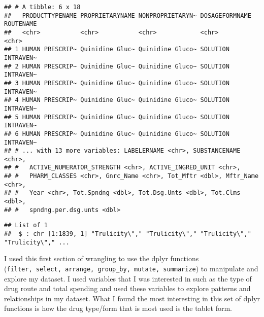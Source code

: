 \documentclass[
]{article}
\newenvironment{Shaded}{\begin{snugshade}}{\end{snugshade}}
\newcommand{\CommentTok}[1]{\textcolor[rgb]{0.56,0.35,0.01}{\textit{#1}}}
\newcommand{\KeywordTok}[1]{\textcolor[rgb]{0.13,0.29,0.53}{\textbf{#1}}}
\newcommand{\NormalTok}[1]{#1}
\newcommand{\OperatorTok}[1]{\textcolor[rgb]{0.81,0.36,0.00}{\textbf{#1}}}
\newcommand{\StringTok}[1]{\textcolor[rgb]{0.31,0.60,0.02}{#1}}
\begin{document}
\begin{verbatim}
## # A tibble: 6 x 18
##   PRODUCTTYPENAME PROPRIETARYNAME NONPROPRIETARYN~ DOSAGEFORMNAME ROUTENAME
##   <chr>           <chr>           <chr>            <chr>          <chr>    
## 1 HUMAN PRESCRIP~ Quinidine Gluc~ Quinidine Gluco~ SOLUTION       INTRAVEN~
## 2 HUMAN PRESCRIP~ Quinidine Gluc~ Quinidine Gluco~ SOLUTION       INTRAVEN~
## 3 HUMAN PRESCRIP~ Quinidine Gluc~ Quinidine Gluco~ SOLUTION       INTRAVEN~
## 4 HUMAN PRESCRIP~ Quinidine Gluc~ Quinidine Gluco~ SOLUTION       INTRAVEN~
## 5 HUMAN PRESCRIP~ Quinidine Gluc~ Quinidine Gluco~ SOLUTION       INTRAVEN~
## 6 HUMAN PRESCRIP~ Quinidine Gluc~ Quinidine Gluco~ SOLUTION       INTRAVEN~
## # ... with 13 more variables: LABELERNAME <chr>, SUBSTANCENAME <chr>,
## #   ACTIVE_NUMERATOR_STRENGTH <chr>, ACTIVE_INGRED_UNIT <chr>,
## #   PHARM_CLASSES <chr>, Gnrc_Name <chr>, Tot_Mftr <dbl>, Mftr_Name <chr>,
## #   Year <chr>, Tot.Spndng <dbl>, Tot.Dsg.Unts <dbl>, Tot.Clms <dbl>,
## #   spndng.per.dsg.unts <dbl>
\end{verbatim}

\begin{Shaded}
\end{Shaded}

\begin{verbatim}
## List of 1
##  $ : chr [1:1839, 1] "Trulicity\"," "Trulicity\"," "Trulicity\"," "Trulicity\"," ...
\end{verbatim}

I used this first section of wrangling to use the dplyr functions
(\texttt{filter,\ select,\ arrange,\ group\_by,\ mutate,\ summarize}) to
manipulate and explore my dataset. I used variables that I was
interested in such as the type of drug route and total spending and used
these variables to explore patterns and relationships in my dataset.
What I found the most interesting in this set of dplyr functions is how
the drug type/form that is most used is the tablet form.
\end{document}
